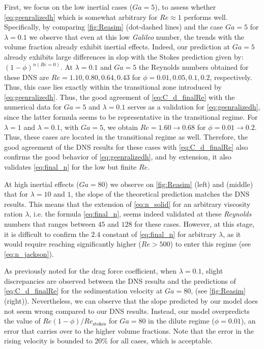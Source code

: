 First, we focus on the low inertial cases ($Ga = 5$), to assess whether \ref{eq:geenralizedh} which is somewhat arbitrary for $Re \approx 1$ performs well. 
Specifically, by comparing \ref{fig:Reasim} (dot-dashed lines) and the case $Ga =5$ for $\lambda=0.1$ we observe that even at this low \textit{Galileo} number, the trends with the volume fraction already exhibit inertial effects. 
Indeed, our prediction at $Ga =5$ already exhibits large differences in slop with the Stokes prediction given by: $(1-\phi)^{n(Re=0)}$. 
At $\lambda = 0.1$ and $Ga = 5$ the Reynolds numbers obtained for these DNS are $Re = 1.10, 0.80, 0.64, 0.43$ for $\phi = 0.01, 0.05, 0.1, 0.2$, respectively.
Thus, this case lies exactly within the transitional zone introduced by \ref{eq:geenralizedh}. 
Thus, the good agreement of \ref{eq:C_d_finalRe} with the numerical data for $Ga = 5$ and $\lambda = 0.1$ serves as a validation for \ref{eq:geenralizedh}, since the latter formula seems to be representative in the transitional regime. 
For $\lambda = 1$ and $\lambda = 0.1$, with $Ga = 5$, we obtain $Re = 1.60 \to 0.68$ for $\phi = 0.01 \to 0.2$.
Thus, these cases are located in the transitional regime as well.  
Therefore, the good agreement of the DNS results for these cases with \ref{eq:C_d_finalRe} also confirms the good behavior of \ref{eq:geenralizedh}, and by extension, it also validates \ref{eq:final_n} for the low but finite $Re$. 


At high inertial effects ($Ga = 80$) we observe on \ref{fig:Reasim} (left) and (middle) that for $\lambda = 10$ and $1$, the slope of the theoretical prediction matches the DNS results. 
This means that the extension of \ref{eq:n_solid} for an arbitrary viscosity ration $\lambda$, i.e. the formula \ref{eq:final_n}, seems indeed validated at these \textit{Reynolds} numbers that ranges between $45$ and $128$ for these cases.  
However, at this stage, it is difficult to confirm the $2.4$ constant of \ref{eq:final_n} for arbitrary $\lambda$, as it would require reaching significantly higher ($Re > 500$) to enter this regime (see \ref{eq:n_jackson}). 

As previously noted for the drag force coefficient, when $\lambda=0.1$, slight discrepancies are observed between the DNS results and the predictions of \ref{eq:C_d_finalRe} for the sedimentation velocity at $Ga = 80$, (see \ref{fig:Reasim} (right)). 
Nevertheless, we can observe that the slope predicted by our model does not seem wrong compared to our DNS results. 
Instead, our model overpredicts the value of $Re (1-\phi)  / Re_\text{stokes}$  for  $Ga = 80$ in the dilute regime ($\phi = 0.01$), an error that carries over to the higher volume fractions. 
Note that the error in the rising velocity is bounded to $20\%$ for all cases, which is acceptable. 

